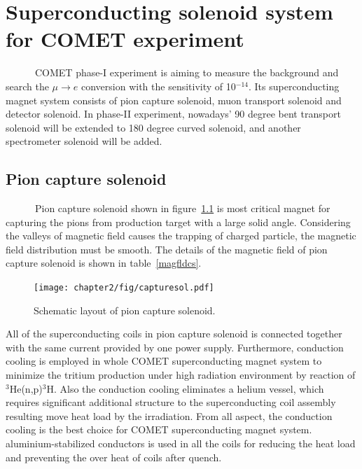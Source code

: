 \chapter{Superconducting solenoid system for COMET experiment}
~~~~~~COMET phase-I experiment is aiming to measure the background and search the $\mu \rightarrow e$ conversion with the sensitivity of 10$^{-14}$.
Its superconducting magnet system consists of pion capture solenoid, muon transport solenoid and detector solenoid.
In phase-II experiment, nowadays' 90 degree bent transport solenoid will be extended to 180 degree curved solenoid, and another spectrometer solenoid will be added.
 
 \section{Pion capture solenoid}
~~~~~~Pion capture solenoid shown in figure~\ref{capturesol} is most critical magnet for capturing the pions from production target with a large solid angle.
Considering the valleys of magnetic field causes the trapping of charged particle, the magnetic field distribution must be smooth.
The details of the magnetic field of pion capture solenoid is shown in table~\ref{magfldcs}.
\begin{figure}[H]
 \centering
 \texttt{[image: chapter2/fig/capturesol.pdf]}
 \caption{Schematic layout of pion capture solenoid.}
 \label{capturesol}
\end{figure}
All of the superconducting coils in pion capture solenoid is connected together with the same current provided by one power supply.
Furthermore, conduction cooling is employed in whole COMET superconducting magnet system to minimize the tritium production under high radiation environment by reaction of $^3$He(n,p)$^3$H.
Also the conduction cooling eliminates a helium vessel, which requires significant additional structure to the superconducting coil assembly resulting move heat load by the irradiation.
From all aspect, the conduction cooling is the best choice for COMET superconducting magnet system.
aluminium-stabilized conductors is used in all the coils for reducing the heat load and preventing the over heat of coils after quench.
